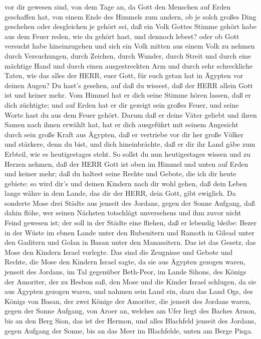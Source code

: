 vor dir gewesen sind, von dem Tage an, da Gott den Menschen auf Erden
geschaffen hat, von einem Ende des Himmels zum andern, ob je solch
großes Ding geschehen oder desgleichen je gehört sei,  daß
ein Volk Gottes Stimme gehört habe aus dem Feuer reden, wie du gehört
hast, und dennoch lebest?  oder ob Gott versucht habe
hineinzugehen und sich ein Volk mitten aus einem Volk zu nehmen durch
Versuchungen, durch Zeichen, durch Wunder, durch Streit und durch eine
mächtige Hand und durch einen ausgestreckten Arm und durch sehr
schreckliche Taten, wie das alles der HERR, euer Gott, für euch getan
hat in Ägypten vor deinen Augen?  Du hast's gesehen, auf
daß du wissest, daß der HERR allein Gott ist und keiner mehr.
 Vom Himmel hat er dich seine Stimme hören lassen, daß er
dich züchtigte; und auf Erden hat er dir gezeigt sein großes Feuer, und
seine Worte hast du aus dem Feuer gehört.  Darum daß er
deine Väter geliebt und ihren Samen nach ihnen erwählt hat, hat er dich
ausgeführt mit seinem Angesicht durch sein große Kraft aus Ägypten,
 daß er vertriebe vor dir her große Völker und stärkere,
denn du bist, und dich hineinbrächte, daß er dir ihr Land gäbe zum
Erbteil, wie es heutigestages steht.  So sollst du nun
heutigestages wissen und zu Herzen nehmen, daß der HERR Gott ist oben im
Himmel und unten auf Erden und keiner mehr;  daß du haltest
seine Rechte und Gebote, die ich dir heute gebiete: so wird dir's und
deinen Kindern nach dir wohl gehen, daß dein Leben lange währe in dem
Lande, das dir der HERR, dein Gott, gibt ewiglich.  Da
sonderte Mose drei Städte aus jenseit des Jordans, gegen der Sonne
Aufgang,  daß dahin flöhe, wer seinen Nächsten totschlägt
unversehens und ihm zuvor nicht Feind gewesen ist; der soll in der
Städte eine fliehen, daß er lebendig bleibe:  Bezer in der
Wüste im ebnen Lande unter den Rubenitern und Ramoth in Gilead unter den
Gaditern und Golan in Basan unter den Manassitern.  Das ist
das Gesetz, das Mose den Kindern Israel vorlegte.  Das sind
die Zeugnisse und Gebote und Rechte, die Mose den Kindern Israel sagte,
da sie aus Ägypten gezogen waren,  jenseit des Jordans, im
Tal gegenüber Beth-Peor, im Lande Sihons, des Königs der Amoriter, der
zu Hesbon saß, den Mose und die Kinder Israel schlugen, da sie aus
Ägypten gezogen waren,  und nahmen sein Land ein, dazu das
Land Ogs, des Königs von Basan, der zwei Könige der Amoriter, die
jenseit des Jordans waren, gegen der Sonne Aufgang,  von
Aroer an, welches am Ufer liegt des Baches Arnon, bis an den Berg Sion,
das ist der Hermon,  und alles Blachfeld jenseit des
Jordans, gegen Aufgang der Sonne, bis an das Meer im Blachfelde, unten
am Berge Pisga.

